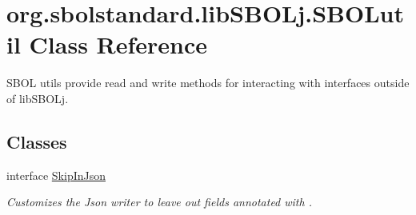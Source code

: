 \hypertarget{classorg_1_1sbolstandard_1_1lib_s_b_o_lj_1_1_s_b_o_lutil}{
\section{org.sbolstandard.libSBOLj.SBOLutil Class Reference}
\label{classorg_1_1sbolstandard_1_1lib_s_b_o_lj_1_1_s_b_o_lutil}
}


SBOL utils provide read and write methods for interacting with interfaces outside of libSBOLj.  


\subsection*{Classes}
\begin{DoxyCompactItemize}
\item 
interface \hyperlink{interfaceorg_1_1sbolstandard_1_1lib_s_b_o_lj_1_1_s_b_o_lutil_1_1_skip_in_json}{SkipInJson}
\begin{DoxyCompactList}\small\item\em Customizes the Json writer to leave out fields annotated with . \item\end{DoxyCompactList}\end{DoxyCompactItemize}
